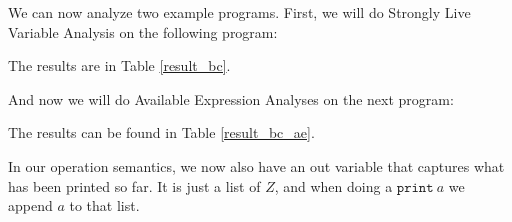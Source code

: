 \documentclass[a4wide,12pt]{article}
\def\print{\texttt{print}\ }
\def\cont {\texttt{continue}\ }
\def\breakc{\texttt{break}\ }
\def\program#1{\fbox{\begin{minipage}{0.5\textwidth}\protect{$\begin{array}{ll} #1 \end{array}$}\end{minipage}}}
\def\restabR#1#2[#3]{\begin{table}\label{#3}\begin{center}\caption{#1}\begin{sideways}\end{sideways}\end{center}\end{table}}
\begin{document}
We can now analyze two example programs. First, we will do Strongly Live Variable Analysis on the following program:
 
\program{}

The results are in Table \ref{result_bc}.

\restabR{Strongly Live Variable Analysis with $\breakc$ and $\cont$}{result_bc}[result_bc]

And now we will do Available Expression Analyses on the next program:

\program{}

The results can be found in Table \ref{result_bc_ae}.

\restabR{Available Expression Analysis with $\breakc$ and $\cont$}{result_bc_ae}[result_bc_ae]

In our operation semantics, we now also have an out variable that captures what has been printed so far. It is just a list of $Z$, and when doing a $\print a$ we append $a$ to that list.
 
\end{document}
